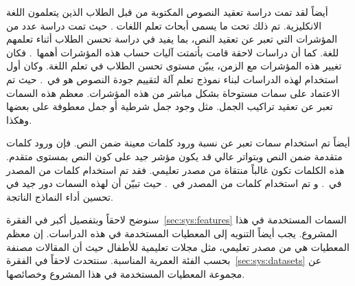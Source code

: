 أيضاً لقد تمت دراسة تعقيد النصوص المكتوبة من قبل الطلاب الذين يتعلمون اللغة الانكليزية.
تم ذلك تحت ما يسمى أبحاث تعلم اللغات .
حيث تمت دراسة عدد من المؤشرات التي تعبر عن تعقيد النص، بما يفيد في دراسة تحسن الطلاب أثناء تعلمهم للغة.
كما أن دراسات لاحقة قامت بأتمتت آليات حساب هذه المؤشرات أهمها~\cite{lu2010}.
فكان تغيير هذه المؤشرات مع الزمن، يبيّن مستوى تحسن الطلاب في تعلم اللغة.
وكان أول استخدام لهذه الدراسات لبناء نموذج تعلم آلة لتقييم جودة النصوص هو في~\cite{vajjala2012}.
حيث تم الاعتماد على سمات مستوحاة بشكل مباشر من هذه المؤشرات.
معظم هذه السمات تعبر عن تعقيد تراكيب الجمل.
مثل وجود جمل شرطية أو جمل معطوفة على بعضها وهكذا.

أيضاً تم استخدام سمات تعبر عن نسبة ورود كلمات معينة ضمن النص.
فإن ورود كلمات متقدمة ضمن النص وبتواتر عالي قد يكون مؤشر جيد على كون النص بمستوى متقدم.
هذه الكلمات تكون غالباً منتقاة من مصدر تعليمي.
فقد تم استخدام كلمات من المصدر
في~\cite{vajjala2012,vajjala2014,vajjala2018}.
و تم استخدام كلمات من المصدر
في~\cite{xia2016}.
حيث تبيّن أن لهذه السمات دور جيد في تحسين أداء النماذج الناتجة.

سنوضح لاحقاً  وبتفصيل أكبر في الفقرة~\ref{sec:sys:features} السمات المستخدمة في هذا المشروع.
يجب أيضاً التنويه إلى المعطيات المستخدمة في هذه الدراسات.
إن معظم المعطيات هي من مصدر تعليمي،
مثل مجلات تعليمية للأطفال حيث أن المقالات مصنفة بحسب الفئة العمرية المناسبة.
سنتحدث لاحقاً في الفقرة~\ref{sec:sys:datasets} عن مجموعة المعطيات المستخدمة في هذا المشروع وخصائصها.



